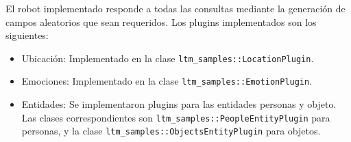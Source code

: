 El robot implementado responde a todas las consultas mediante la generación de campos aleatorios que sean requeridos. Los plugins implementados son los siguientes:
\begin{itemize}
	\item Ubicación: Implementado en la clase \texttt{ltm\_samples::LocationPlugin}.
	\item Emociones: Implementado en la clase \texttt{ltm\_samples::EmotionPlugin}.
	\item Entidades: Se implementaron plugins para las entidades personas y objeto. Las clases correspondientes son \texttt{ltm\_samples::PeopleEntityPlugin} para personas, y la clase  \texttt{ltm\_samples::ObjectsEntityPlugin} para objetos.
\end{itemize}












